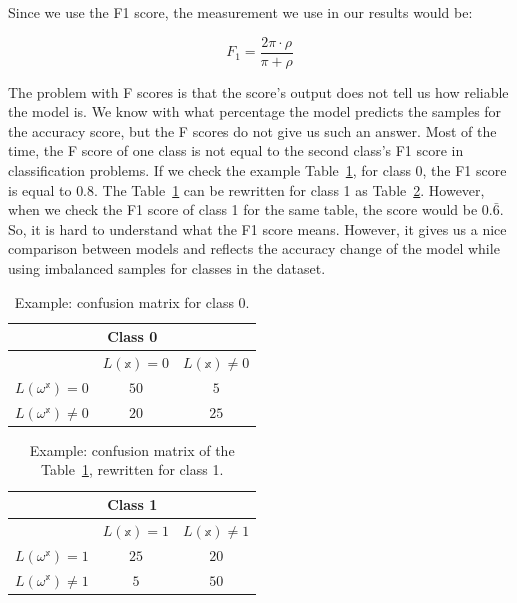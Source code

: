 Since we use the F1 score, the measurement we use in our results would be:
\vspace{10pt}

\begin{equation}
F_{1} = \frac{2\pi\cdot\rho}{\pi + \rho}\label{f1score}
\end{equation}
\vspace{10pt}


The problem with F scores is that the score’s output does not tell us how reliable the model is. We know with what percentage the model predicts the samples for the accuracy score, but the F scores do not give us such an answer. Most of the time, the F score of one class is not equal to the second class’s F1 score in classification problems. If we check the example Table~\ref{confmax0}, for class 0, the F1 score is equal to $0.8$. The Table~\ref{confmax0} can be rewritten for class 1 as Table~\ref{confmax1}. However, when we check the F1 score of class 1 for the same table, the score would be $0.\bar{6}$. So, it is hard to understand what the F1 score means. However, it gives us a nice comparison between models and reflects the accuracy change of the model while using imbalanced samples for classes in the dataset.

\begin{table}[H]
\centering
\begin{tabular}{| c ||c| c| }
  \multicolumn{3}{c}{Class 0}\\
 \hline
& $L(\mathbb{x}) = 0 $ & $L(\mathbb{x}) \neq 0$\\[0.5ex]
 \hline\hline
$L(\omega^{\mathbb{x}}) = 0$ & $50$ & $5$ \\
 \hline
 $L(\omega^{\mathbb{x}}) \neq 0$ & $20$  & $25$ \\
 \hline
\end{tabular}
\caption{Example: confusion matrix for class 0.}
\label{confmax0}
\end{table}

\begin{table}[H]
\centering
\begin{tabular}{| c ||c| c| }
  \multicolumn{3}{c}{Class 1}\\
 \hline
& $L(\mathbb{x}) = 1 $ & $L(\mathbb{x}) \neq 1$\\[0.5ex]
 \hline\hline
$L(\omega^{\mathbb{x}}) = 1$ & $25$ & $20$ \\
 \hline
 $L(\omega^{\mathbb{x}}) \neq 1$ & $5$  & $50$ \\
 \hline
\end{tabular}
\caption{Example: confusion matrix of the Table~\ref{confmax0}, rewritten for class 1.}
\label{confmax1}
\end{table}

